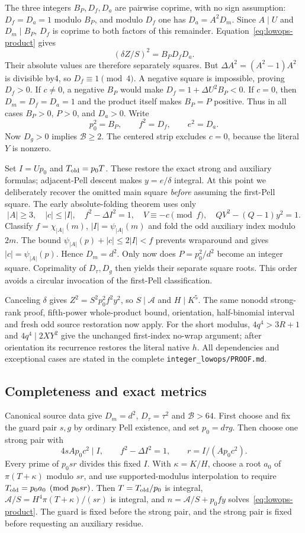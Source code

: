 The three integers $B_P,D_f,D_a$ are pairwise coprime, with no sign
assumption: $D_f=D_a=1$ modulo $B_P$, and modulo $D_f$ one has
$D_a=A^2D_m$. Since $A\mid U$ and $D_m\mid B_P$, $D_f$ is coprime
to both factors of this remainder. Equation~\eqref{eq:lowops-product}
gives
\[
 (\delta Z/S)^2=B_PD_fD_a.
\]
Their absolute values are therefore separately squares. But
$\Delta A^2=(A^2-1)A^2$ is divisible by4, so $D_f\equiv1\pmod4$.
A negative square is impossible, proving $D_f>0$.
If $c\ne0$, a negative $B_P$ would make
$D_f=1+\Delta U^2B_P<0$. If $c=0$, then $D_m=D_f=D_a=1$ and the
product itself makes $B_P=P$ positive. Thus in all cases $B_P>0$, $P>0$,
and $D_a>0$. Write
\[
 p_0^2=B_P,\qquad f^2=D_f,\qquad e^2=D_a.
\]
Now $D_g>0$ implies $\mathcal B\ge2$. The centered strip excludes
$c=0$, because the literal $Y$ is nonzero.

Set $I=Up_0$ and $T_{\rm old}=p_0T$. These restore the exact strong and
auxiliary formulas; adjacent-Pell descent makes $y=e/\delta$ integral.
At this point we deliberately recover the omitted main square
\emph{before} assuming the first-Pell square.
The early absolute-folding theorem uses only
\[
 |A|\ge3,\quad |c|\le|I|,\quad f^2-\Delta I^2=1,
 \quad V\equiv-c\pmod f,
 \quad QV^2-(Q-1)y^2=1.
\]
Classify $f=\chi_{|A|}(m)$, $|I|=\psi_{|A|}(m)$ and fold the odd
auxiliary index modulo $2m$. The bound
$\psi_{|A|}(p)+|c|\le2|I|<f$ prevents wraparound and gives
$|c|=\psi_{|A|}(p)$. Hence $D_m=d^2$.
Only now does $P=p_0^2/d^2$ become an integer square. Coprimality of
$D_\tau,D_g$ then yields their separate square roots. This order avoids
a circular invocation of the first-Pell classification.

Canceling $\delta$ gives $Z^2=S^2p_0^2f^2y^2$, so $S\mid\mathcal A$
and $H\mid K^5$. The same nonodd strong-rank proof, fifth-power
whole-product bound, orientation, half-binomial interval and fresh odd
source restoration now apply. For the short modulus, $4q^4>3R+1$ and
$4q^4\mid2XY^2$ give the unchanged first-index no-wrap argument;
after orientation its recurrence restores the literal native $h$.
All dependencies and exceptional cases are stated in the complete
\texttt{integer\_lowops/PROOF.md}.

\subsection{Completeness and exact metrics}
Canonical source data give $D_m=d^2$, $D_\tau=\tau^2$ and
$\mathcal B>64$. First choose and fix the guard pair $s,g$ by ordinary
Pell existence, and set $p_0=d\tau g$. Then choose one strong pair with
\[
 4sAp_0c^2\mid I,\qquad f^2-\Delta I^2=1,\qquad
 r=I/(Ap_0c^2).
\]
Every prime of $p_0sr$ divides this fixed $I$.
With $\kappa=K/H$, choose a root $a_0$ of $\pi(T+\kappa)$ modulo $sr$,
and use supported-modulus interpolation to require
$T_{\rm old}=p_0a_0\pmod{p_0sr}$.
Then $T=T_{\rm old}/p_0$ is integral,
$\mathcal A/S=H^4\pi(T+\kappa)/(sr)$ is integral, and
$n=\mathcal A/S+p_0fy$ solves~\eqref{eq:lowops-product}.
The guard is fixed before the strong pair, and the strong pair is fixed
before requesting an auxiliary residue.

